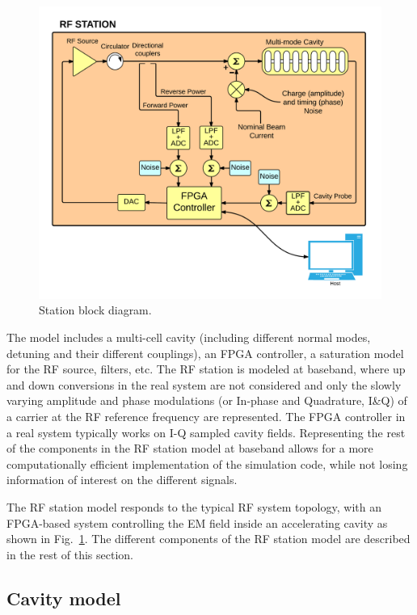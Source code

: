 \documentclass[a4paper,12pt]{article}
\begin{document}
\begin{figure}
\centering
\includegraphics[scale=0.75]{../figures/Station_rf_blocks.png}
\caption{Station block diagram.}
\label{fig:Station_block_diagram}
\end{figure}

The model includes a multi-cell cavity (including different normal modes, detuning and their different couplings), an FPGA controller, a saturation model for the RF source, filters, etc. The RF station is modeled at baseband, where up and down conversions in the real system are not considered and only the slowly varying amplitude and phase modulations (or In-phase and Quadrature, I\&Q) of a carrier at the RF reference frequency are represented. The FPGA controller in a real system typically works on I-Q sampled cavity fields. Representing the rest of the components in the RF station model at baseband allows for a more computationally efficient implementation of the simulation code, while not losing information of interest on the different signals. 

The RF station model responds to the typical RF system topology, with an FPGA-based system controlling the EM field inside an accelerating cavity as shown in Fig.~\ref{fig:Station_block_diagram}. The different components of the RF station model are described in the rest of this section.

\subsection{Cavity model}
\end{document}
